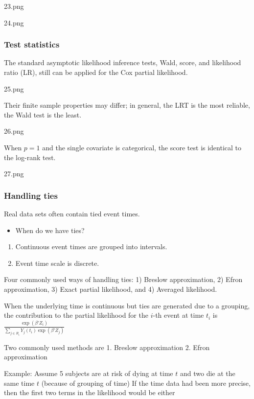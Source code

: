 \documentclass[
]{book}
\providecommand{\tightlist}{%
  \setlength{\itemsep}{0pt}\setlength{\parskip}{0pt}}
\begin{document}
{{{23.png

24.png

\hypertarget{test-statistics}{%
\subsubsection{Test statistics}\label{test-statistics}}

The standard asymptotic likelihood inference tests, Wald, score, and likelihood ratio (LR), still can be applied for the Cox partial likelihood.

25.png

Their finite sample properties may differ; in general, the LRT is the most reliable, the Wald test is the least.

26.png

When \(p = 1\) and the single covariate is categorical, the score test is identical to the log-rank test.

27.png

\hypertarget{handling-ties}{%
\subsubsection{Handling ties}\label{handling-ties}}

Real data sets often contain tied event times.

\begin{itemize}
\tightlist
\item
  When do we have ties?
\end{itemize}

\begin{enumerate}
\def\labelenumi{\arabic{enumi}.}
\tightlist
\item
  Continuous event times are grouped into intervals.
\item
  Event time scale is discrete.
\end{enumerate}

Four commonly used ways of handling ties: 1) Breslow approximation, 2) Efron approximation, 3) Exact partial likelihood, and 4) Averaged likelihood.

When the underlying time is continuous but ties are generated due to a grouping, the contribution to the partial likelihood for the \(i\)-th event at time \(t_i\) is \(\frac{\exp(\beta ' Z_i)}{ \sum\limits_{j \in R_i} Y_j(t_i) \exp(\beta ' Z_j)}\)

Two commonly used methods are
1. Breslow approximation
2. Efron approximation

Example: Assume 5 subjects are at risk of dying at time \(t\) and two die at the same time \(t\) (because of grouping of time) If the time data had been more precise, then the first two terms in the likelihood would be either

}}}
\end{document}
